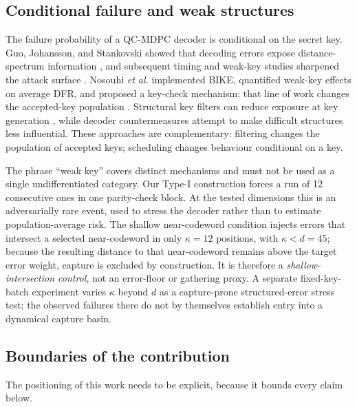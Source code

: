 \documentclass[lettersize,journal]{IEEEtran}
\begin{document}
\subsection{Conditional failure and weak structures}

The failure probability of a QC-MDPC decoder is conditional on the secret key. Guo, Johansson, and Stankovski showed that decoding errors expose distance-spectrum information \cite{guo2016key}, and subsequent timing and weak-key studies sharpened the attack surface \cite{eaton2018timing,wang2023weak,gellersen2025}. Nosouhi \emph{et al.} implemented BIKE, quantified weak-key effects on average DFR, and proposed a key-check mechanism; that line of work changes the accepted-key population \cite{nosouhi2023weakkey}. Structural key filters can reduce exposure at key generation \cite{matthews2025combinatorial}, while decoder countermeasures attempt to make difficult structures less influential. These approaches are complementary: filtering changes the population of accepted keys; scheduling changes behaviour conditional on a key.

The phrase ``weak key'' covers distinct mechanisms and must not be used as a single undifferentiated category. Our Type-I construction forces a run of 12 consecutive ones in one parity-check block. At the tested dimensions this is an adversarially rare event, used to stress the decoder rather than to estimate population-average risk. The shallow near-codeword condition injects errors that intersect a selected near-codeword in only $\kappa=12$ positions, with $\kappa<d=45$; because the resulting distance to that near-codeword remains above the target error weight, capture is excluded by construction. It is therefore a \emph{shallow-intersection control}, not an error-floor or gathering proxy. A separate fixed-key-batch experiment varies $\kappa$ beyond $d$ as a capture-prone structured-error stress test; the observed failures there do not by themselves establish entry into a dynamical capture basin.

\subsection{Boundaries of the contribution}

The positioning of this work needs to be explicit, because it bounds every claim below.
\end{document}
